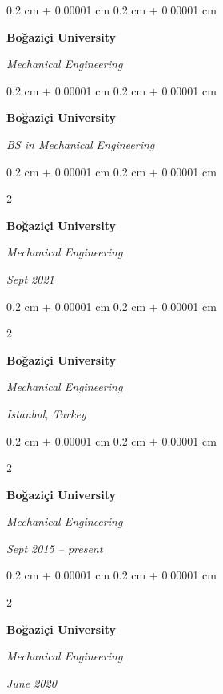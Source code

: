 \documentclass[10pt, letterpaper]{article}
\newenvironment{onecolentry}{
    \begin{adjustwidth}{
        0.2 cm + 0.00001 cm
    }{
        0.2 cm + 0.00001 cm
    }
}{
    \end{adjustwidth}
} %
\newenvironment{twocolentry}[2][]{
    \onecolentry
    \def\secondColumn{#2}
    \setcolumnwidth{\fill, 4.5 cm}
    \begin{paracol}{2}
}{
    \switchcolumn \raggedleft \secondColumn
    \end{paracol}
    \endonecolentry
} %
\begin{document}
        
        \begin{onecolentry}
            \textbf{Boğaziçi University}

            \textit{Mechanical Engineering}
        \end{onecolentry}



        \vspace{0.2 cm}

        \begin{onecolentry}
            \textbf{Boğaziçi University}

            \textit{BS in Mechanical Engineering}
        \end{onecolentry}



        \vspace{0.2 cm}

        \begin{twocolentry}{
            
            
        \textit{Sept 2021}}
            \textbf{Boğaziçi University}

            \textit{Mechanical Engineering}
        \end{twocolentry}



        \vspace{0.2 cm}

        \begin{twocolentry}{
        \textit{Istanbul, Turkey}    
            
        }
            \textbf{Boğaziçi University}

            \textit{Mechanical Engineering}
        \end{twocolentry}



        \vspace{0.2 cm}

        \begin{twocolentry}{
            
            
        \textit{Sept 2015 – present}}
            \textbf{Boğaziçi University}

            \textit{Mechanical Engineering}
        \end{twocolentry}



        \vspace{0.2 cm}

        \begin{twocolentry}{
            
            
        \textit{June 2020}}
            \textbf{Boğaziçi University}

            \textit{Mechanical Engineering}
        \end{twocolentry}
\end{document}
